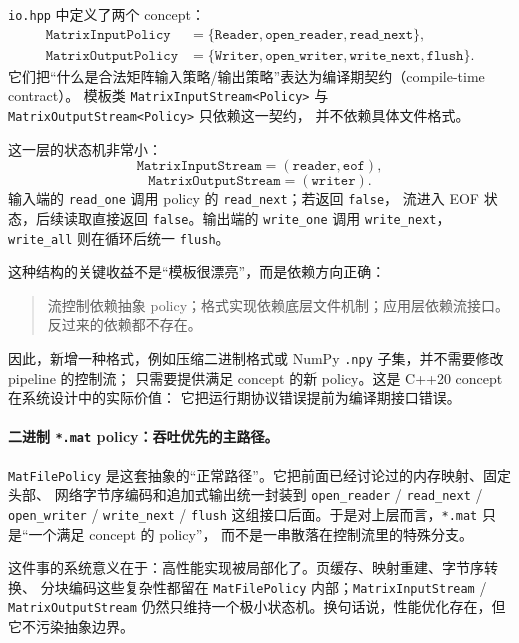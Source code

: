 \texttt{io.hpp} 中定义了两个 concept：
\[
    \begin{aligned}
        \texttt{MatrixInputPolicy}  & =
        \{\texttt{Reader},\texttt{open\_reader},\texttt{read\_next}\}, \\
        \texttt{MatrixOutputPolicy} & =
        \{\texttt{Writer},\texttt{open\_writer},\texttt{write\_next},\texttt{flush}\}.
    \end{aligned}
\]
它们把“什么是合法矩阵输入策略/输出策略”表达为编译期契约（compile-time contract）。
模板类 \texttt{MatrixInputStream<Policy>} 与 \texttt{MatrixOutputStream<Policy>} 只依赖这一契约，
并不依赖具体文件格式。

这一层的状态机非常小：
\[
    \texttt{MatrixInputStream}
    =
    (\texttt{reader},\texttt{eof}),
\]
\[
    \texttt{MatrixOutputStream}
    =
    (\texttt{writer}).
\]
输入端的 \texttt{read\_one} 调用 policy 的 \texttt{read\_next}；若返回 \texttt{false}，
流进入 EOF 状态，后续读取直接返回 \texttt{false}。输出端的 \texttt{write\_one} 调用
\texttt{write\_next}，\texttt{write\_all} 则在循环后统一 \texttt{flush}。

这种结构的关键收益不是“模板很漂亮”，而是依赖方向正确：

\begin{quote}
    流控制依赖抽象 policy；格式实现依赖底层文件机制；应用层依赖流接口。反过来的依赖都不存在。
\end{quote}

因此，新增一种格式，例如压缩二进制格式或 NumPy \texttt{.npy} 子集，并不需要修改 pipeline 的控制流；
只需要提供满足 concept 的新 policy。这是 C++20 concept 在系统设计中的实际价值：
它把运行期协议错误提前为编译期接口错误。

\paragraph{二进制 \texttt{*.mat} policy：吞吐优先的主路径。}
\texttt{MatFilePolicy} 是这套抽象的“正常路径”。它把前面已经讨论过的内存映射、固定头部、
网络字节序编码和追加式输出统一封装到
\texttt{open\_reader} / \texttt{read\_next} / \texttt{open\_writer} / \texttt{write\_next} / \texttt{flush}
这组接口后面。于是对上层而言，\texttt{*.mat} 只是“一个满足 concept 的 policy”，
而不是一串散落在控制流里的特殊分支。

这件事的系统意义在于：高性能实现被局部化了。页缓存、映射重建、字节序转换、
分块编码这些复杂性都留在 \texttt{MatFilePolicy} 内部；\texttt{MatrixInputStream} /
\texttt{MatrixOutputStream} 仍然只维持一个极小状态机。换句话说，性能优化存在，但它不污染抽象边界。

